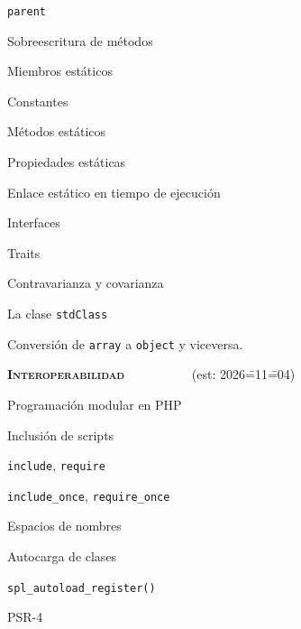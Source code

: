 \begin{longenum}
\begin{longenum}
\begin{longenum}
            \item \texttt{parent}
            \item Sobreescritura de métodos
        \end{longenum}
        \item Miembros estáticos
        \begin{longenum}
            \item Constantes
            \item Métodos estáticos
            \item Propiedades estáticas
            \item Enlace estático en tiempo de ejecución
        \end{longenum}
        \item Interfaces
        \item Traits
        \item Contravarianza y covarianza
        \item La clase \texttt{stdClass}
        \begin{longenum}
            \item Conversión de \texttt{array} a \texttt{object} y viceversa.
        \end{longenum}
    \end{longenum}
    \item \textbf{\textsc{Interoperabilidad}} \ \ \ \ \ \ \ \ \ \ (est: 2026\==11\==04)
    \begin{longenum}
        \item Programación modular en PHP
        \begin{longenum}
            \item Inclusión de scripts
            \begin{longenum}
                \item \texttt{include}, \texttt{require}
                \item \texttt{include\_once}, \texttt{require\_once}
            \end{longenum}
            \item Espacios de nombres
            \item Autocarga de clases
            \begin{longenum}
                \item \texttt{spl\_autoload\_register()}
                \item PSR-4
            \end{longenum}

\end{longenum}
\end{longenum}
\end{longenum}
